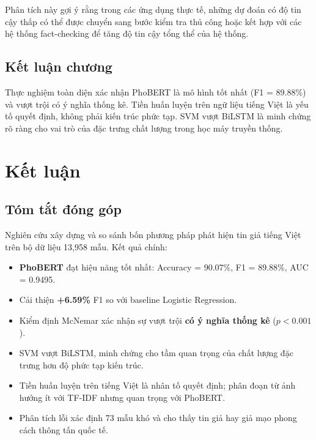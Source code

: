 \documentclass[12pt, a4paper]{report}
\newcommand{\phobert}{PhoBERT\xspace}
\newcommand{\nClean}{13,958}             %
\newcommand{\phobertAcc}{90.07}
\newcommand{\phobertFone}{89.88}
\newcommand{\phobertAUC}{0.9495}
\newcommand{\deltaLR}{6.59}
\newcommand{\nHardExamples}{73}
\begin{document}
Phân tích này gợi ý rằng trong các ứng dụng thực tế, 
những dự đoán có độ tin cậy thấp có thể được chuyển sang bước kiểm tra thủ công 
hoặc kết hợp với các hệ thống fact-checking để tăng độ tin cậy tổng thể của hệ thống.

\section{Kết luận chương}

Thực nghiệm toàn diện xác nhận \phobert là mô hình tốt nhất (F1 = \phobertFone\%) và vượt trội có ý nghĩa thống kê. Tiền huấn luyện trên ngữ liệu tiếng Việt là yếu tố quyết định, không phải kiến trúc phức tạp. SVM vượt BiLSTM là minh chứng rõ ràng cho vai trò của đặc trưng chất lượng trong học máy truyền thống.

\chapter*{Kết luận}

\section*{Tóm tắt đóng góp}

Nghiên cứu xây dựng và so sánh bốn phương pháp phát hiện tin giả tiếng Việt trên bộ dữ liệu \nClean{} mẫu. Kết quả chính:

\begin{itemize}[leftmargin=2em]
  \item \textbf{PhoBERT} đạt hiệu năng tốt nhất: Accuracy = \phobertAcc\%, F1 = \phobertFone\%, AUC = \phobertAUC.
  \item Cải thiện \textbf{+\deltaLR\%} F1 so với baseline Logistic Regression.
  \item Kiểm định McNemar xác nhận sự vượt trội \textbf{có ý nghĩa thống kê} ($p < 0.001$).
  \item SVM vượt BiLSTM, minh chứng cho tầm quan trọng của chất lượng đặc trưng hơn độ phức tạp kiến trúc.
  \item Tiền huấn luyện trên tiếng Việt là nhân tố quyết định; phân đoạn từ ảnh hưởng ít với TF-IDF nhưng quan trọng với PhoBERT.
  \item Phân tích lỗi xác định \nHardExamples{} mẫu khó và cho thấy tin giả hay giả mạo phong cách thông tấn quốc tế.
\end{itemize}
\end{document}
